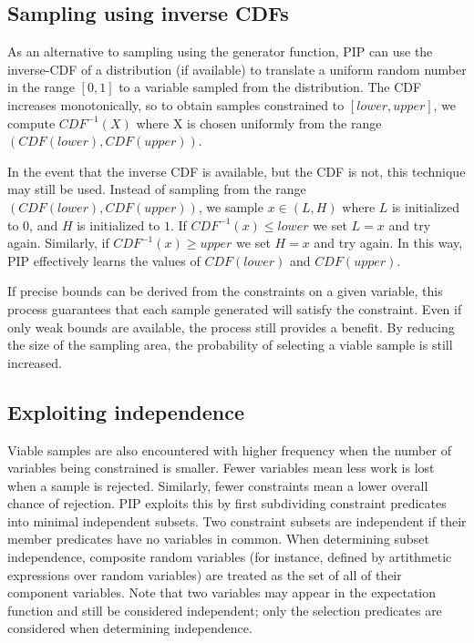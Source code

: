 \subsection{Sampling using inverse CDFs}
\label{subsec:icdf}
As an alternative to sampling using the generator function, PIP can use the inverse-CDF of a distribution (if available) to translate a uniform random number in the range $[0,1]$ to a variable sampled from the distribution.  The CDF increases monotonically, so to obtain samples constrained to $[lower, upper]$, we compute $CDF^{-1}(X)$ where X is chosen uniformly  from the range $(CDF(lower), CDF(upper))$.   

In the event that the inverse CDF is available, but the CDF is not, this technique may still be used.  Instead of sampling from the range $(CDF(lower), CDF(upper))$, we sample $x \in (L,H)$ where $L$ is initialized to $0$, and $H$ is initialized to $1$.  If $CDF^{-1}(x) \leq lower$ we set $L = x$ and try again.  Similarly, if $CDF^{-1}(x)  \geq upper$ we set $H = x$ and try again.   In this way, PIP effectively learns the values of $CDF(lower)$ and $CDF(upper)$.  

If precise bounds can be derived from the constraints on a given variable, this process guarantees that each sample generated will satisfy the constraint.  Even if only weak bounds are available, the process still provides a benefit.  By reducing the size of the sampling area, the probability of selecting a viable sample is still increased.  

\subsection{Exploiting independence}
\label{subsec:independence}
Viable samples are also encountered with higher frequency when the number of variables being constrained is smaller.  Fewer variables mean less work is lost when a sample is rejected.  Similarly, fewer constraints mean a lower overall chance of rejection.  PIP exploits this by first subdividing constraint predicates into minimal independent subsets.  Two constraint subsets are independent if their member predicates have no variables in common.  When determining subset independence, composite random variables (for instance, defined by artithmetic expressions over random variables) are treated as the set of all of their component variables.  Note that two variables may appear in the expectation function and still be considered independent; only the selection predicates are considered when determining independence.

